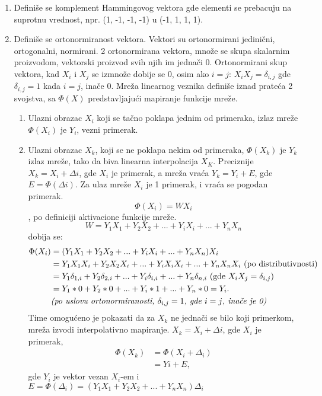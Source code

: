 \documentclass[fontsize=11bp, paper=a4]{scrarticle}
\begin{document}
\begin{enumerate}
\item Definiše se komplement Hammingovog vektora gde elementi se prebacuju na suprotnu vrednost, npr. (1, -1, -1, -1) u (-1, 1, 1, 1).
\item Definiše se ortonormiranost vektora. Vektori su ortonormirani jedinični, ortogonalni, normirani. 2 ortonormirana vektora, množe se skupa skalarnim proizvodom, vektorski proizvod svih njih im jednači 0. Ortonormirani skup vektora, kad $X_i$ i $X_j$ se izmnože dobije se 0, osim ako $i=j$: $X_iX_j = \delta_{i,j}$ gde $\delta_{i,j} = 1$ kada $i = j$, inače 0.
Mreža linearnog veznika definiše iznad prateća 2 svojstva, sa $\Phi(X)$ predstavljajući mapiranje funkcije mreže.
\begin{enumerate}
    \item Ulazni obrazac $X_i$ koji se tačno poklapa jednim od primeraka, izlaz mreže $\Phi(X_i)$ je $Y_i$, vezni primerak.
    \item Ulazni obrazac $X_k$, koji se ne poklapa nekim od primeraka, $\Phi(X_k)$ je $Y_k$ izlaz mreže, tako da biva linearna interpolacija $X_K$. Preciznije $X_k = X_i + \Delta i$, gde $X_i$ je primerak, a mreža vraća $Y_k = Y_i + E$, gde $E = \Phi(\Delta i)$. Za ulaz mreže $X_i$ je 1 primerak, i vraća se pogodan primerak.
    $$
    \Phi(X_i) = WX_i
    $$, po definiciji aktivacione funkcije mreže.
    $$
    W  = Y_1X_1 + Y_2X_2 + ... + Y_iX_i + ... + Y_nX_n
    $$
    dobija se:
    $$
    \begin{aligned}
        \Phi(X_i) &= (Y_1X_1 + Y_2X_2 + ... + Y_iX_i + ... + Y_nX_n)X_i \\
        &= Y_1X_1X_i + Y_2X_2X_i + ... +Y_iX_iX_i + ... + Y_nX_nX_i \textnormal{  (po distributivnosti)}\\
        &= Y_1\delta_{1,i} + Y_2\delta_{2,i} + ... + Y_i\delta_{i,i} + ... + Y_n\delta_{n,i} \textnormal{  (gde  } X_iX_j = \delta_{i,j}) \\
        &= Y_1*0 + Y_2*0 + ... + Y_i*1 + ... + Y_n*0 = Y_i. \\
        &\textit{(po uslovu ortonormiranosti, $\delta_{i,j} = 1$, gde $i = j$, inače je 0)} \\
    \end{aligned}
    $$
    Time omogućeno je pokazati da za $X_k$ ne jednači se bilo koji primerkom, mreža izvodi interpolativno mapiranje. $X_k = X_i + \Delta i$, gde $X_i$ je primerak,
    $$
    \begin{aligned}
        \Phi(X_k)  &= \Phi(X_i + \Delta_i) \\
                &= Yi + E,
    \end{aligned}
    $$
    gde $Y_i$ je vektor vezan $X_i$-em i $E = \Phi(\Delta_i) = (Y_1X_1+ Y_2X_2 + ... + Y_nX_n) \Delta_i$
\end{enumerate}
\end{enumerate}
\end{document}
